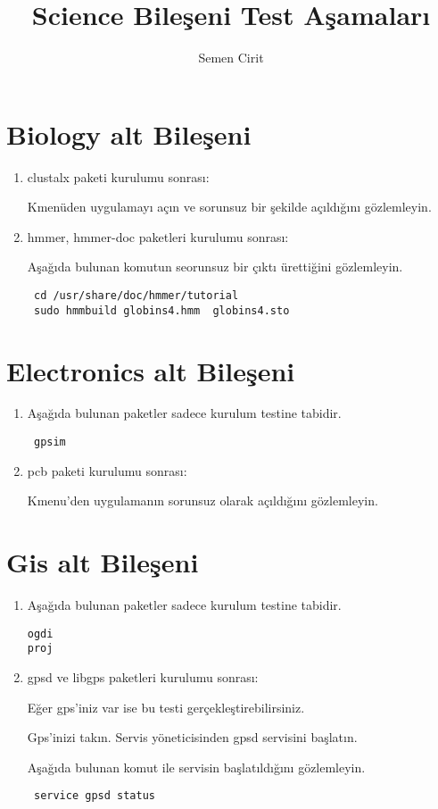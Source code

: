 \documentclass[a4paper,10pt]{article}
\title{Science Bileşeni Test Aşamaları}
\author{Semen Cirit}
\begin{document}
\maketitle
\section{Biology alt Bileşeni}
\begin{enumerate}
 \item clustalx paketi kurulumu sonrası:

Kmenüden uygulamayı açın ve sorunsuz bir şekilde açıldığını gözlemleyin.

\item hmmer, hmmer-doc paketleri kurulumu sonrası:

Aşağıda bulunan komutun seorunsuz bir çıktı ürettiğini gözlemleyin.
\begin{verbatim}
 cd /usr/share/doc/hmmer/tutorial
 sudo hmmbuild globins4.hmm  globins4.sto
\end{verbatim}

\end{enumerate}






\section{Electronics alt Bileşeni}
\begin{enumerate}
 \item Aşağıda bulunan paketler sadece kurulum testine tabidir.
\begin{verbatim}
 gpsim
\end{verbatim}
\item pcb paketi kurulumu sonrası:

Kmenu'den uygulamanın sorunsuz olarak açıldığını gözlemleyin.
\end{enumerate}


\section{Gis alt Bileşeni}
\begin{enumerate}
\item Aşağıda bulunan paketler sadece kurulum testine tabidir.
\begin{verbatim}
ogdi
proj
\end{verbatim}

 \item gpsd ve libgps paketleri kurulumu sonrası:

Eğer gps'iniz var ise bu testi gerçekleştirebilirsiniz.

Gps'inizi takın. Servis yöneticisinden gpsd servisini başlatın.

Aşağıda bulunan komut ile servisin başlatıldığını gözlemleyin.
\begin{verbatim}
 service gpsd status
\end{verbatim}


\end{enumerate}
\end{document}
